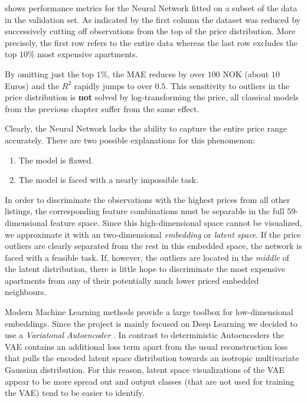  shows performance metrics for the Neural Network fitted on a subset of the data in the validation set.
As indicated by the first column the dataset was reduced by successively cutting off observations from the top of the price distribution.
More precisely, the first row refers to the entire data whereas the last row excludes the top $10$\% most expensive apartments.

By omitting just the top $1$\%, the MAE reduces by over $100$ NOK (about $10$ Euros) and the $R^2$ rapidly jumps to over $0.5$.
This sensitivity to outliers in the price distribution is \textbf{not} solved by log-transforming the price, all classical models from the previous chapter suffer from the same effect.

Clearly, the Neural Network lacks the ability to capture the entire price range accurately.
There are two possible explanations for this phenomenon:
\begin{enumerate}
  \item The model is flawed.
  \item The model is faced with a nearly impossible task.
\end{enumerate}
In order to discriminate the observations with the highest prices from all other listings, the corresponding feature combinations must be separable in the full $59$-dimensional feature space.
Since this high-dimensional space cannot be visualized, we approximate it with an two-dimensional \emph{embedding} or \emph{latent space}.
If the price outliers are clearly separated from the rest in this embedded space, the network is faced with a feasible task.
If, however, the outliers are located in the \emph{middle} of the latent distribution, there is little hope to discriminate the most expensive apartments from any of their potentially much lower priced embedded neighbours.

Modern Machine Learning methods provide a large toolbox for low-dimensional embeddings.
Since the project is mainly focused on Deep Learning we decided to use a \emph{Variatonal Autoencoder} \citep{kingma2014}.
In contrast to deterministic Autoencoders the VAE contains an additional loss term apart from the usual reconstruction loss that pulls the encoded latent space distribution towards an isotropic multivariate Gaussian distribution.
For this reason, latent space visualizations of the VAE appear to be more spread out and output classes (that are not used for training the VAE) tend to be easier to identify.

